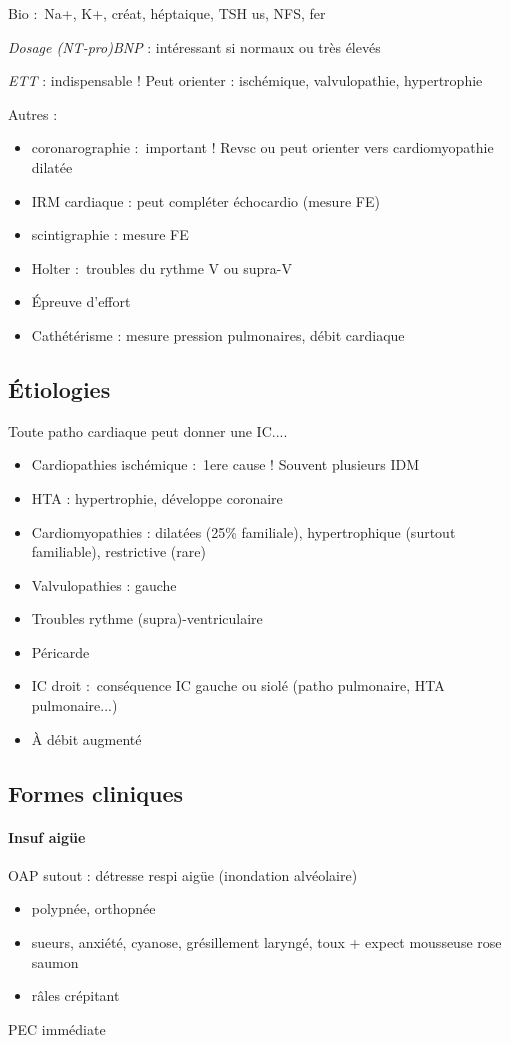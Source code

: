 Bio : Na+, K+, créat, héptaique, TSH us, NFS, fer

\textit{Dosage (NT-pro)BNP}  : intéressant si normaux ou très élevés

\textit{ETT} : indispensable ! Peut orienter : ischémique, valvulopathie,
hypertrophie

Autres :
\begin{itemize}
  \item coronarographie : important ! Revsc ou peut orienter vers cardiomyopathie
    dilatée
  \item IRM cardiaque : peut compléter échocardio (mesure FE)
  \item scintigraphie : mesure FE
  \item Holter : troubles du rythme V ou supra-V
  \item Épreuve d'effort
  \item Cathétérisme : mesure pression pulmonaires, débit cardiaque
\end{itemize}

\subsection{Étiologies}
Toute patho cardiaque peut donner une IC....

\begin{itemize}
  \item Cardiopathies ischémique : 1ere cause ! Souvent plusieurs IDM
  \item HTA : hypertrophie, développe coronaire
  \item Cardiomyopathies : dilatées (25\% familiale), hypertrophique (surtout
    familiable), restrictive (rare)
  \item Valvulopathies : gauche
  \item Troubles rythme (supra)-ventriculaire
  \item Péricarde
  \item IC droit : conséquence IC gauche ou siolé (patho pulmonaire, HTA
    pulmonaire...)
  \item À débit augmenté
\end{itemize}

\subsection{Formes cliniques}
\paragraph{ Insuf aigüe}
OAP sutout : détresse respi aigüe (inondation alvéolaire) 
\begin{itemize}
  \item polypnée, orthopnée
  \item sueurs, anxiété, cyanose, grésillement laryngé, toux + expect mousseuse
    rose saumon
  \item râles crépitant
\end{itemize}
\thus PEC immédiate \skull
   
